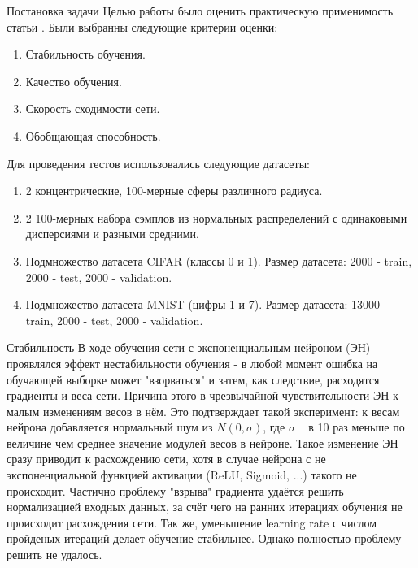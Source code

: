 \documentclass[a4paper,12pt,titlepage,finall]{article}
\begin{document}
	
\begin{section}{Постановка задачи}	
	Целью работы было оценить практическую применимость статьи \cite{AddingOne}. Были выбранны следующие критерии оценки:
\begin{enumerate}
	\item Стабильность обучения.
	\item Качество обучения.
	\item Скорость сходимости сети.
	\item Обобщающая способность.
\end{enumerate}

	Для проведения тестов использовались следующие датасеты:
\begin{enumerate}
	\item 2 концентрические, 100-мерные сферы различного радиуса.
	\item 2 100-мерных набора сэмплов из нормальных распределений с одинаковыми дисперсиями и разными средними.
	\item Подмножество датасета CIFAR (классы 0 и 1). Размер датасета: 2000 - train, 2000 - test, 2000 - validation.
	\item Подмножество датасета MNIST (цифры 1 и 7). Размер датасета: 13000 - train, 2000 - test, 2000 - validation.
\end{enumerate}

\end{section}

\begin{section}{Стабильность}
	В ходе обучения сети с экспоненциальным нейроном (ЭН) проявлялся эффект нестабильности обучения - в любой момент ошибка на обучающей выборке может "взорваться" и затем, как следствие, расходятся градиенты и веса сети. Причина этого в чрезвычайной чувствительности ЭН к малым изменениям весов в нём. Это подтверждает такой эксперимент: к весам нейрона добавляется нормальный шум из $N(0, \sigma)$, где $\sigma$ ~ в 10 раз меньше по величине чем среднее значение модулей весов в нейроне. Такое изменение ЭН сразу приводит к расхождению сети, хотя в случае нейрона с не экспоненциальной функцией активации (ReLU, Sigmoid, ...) такого не происходит. Частично проблему "взрыва" градиента удаётся решить нормализацией входных данных, за счёт чего на ранних итерациях обучения не происходит расхождения сети. Так же, уменьшение learning rate с числом пройденых итераций делает обучение стабильнее. Однако полностью проблему решить не удалось.
\end{section}
\end{document}
